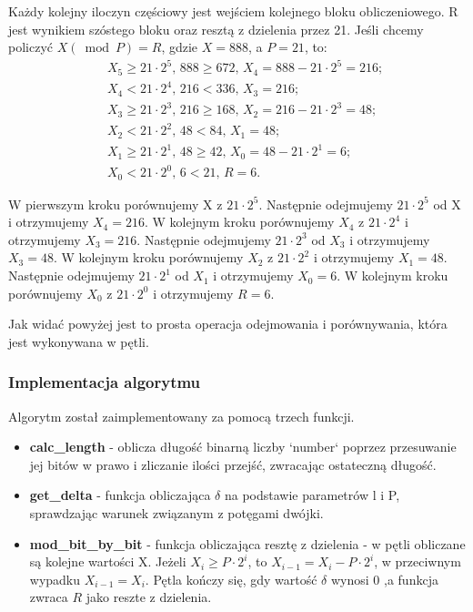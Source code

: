 \documentclass[11pt]{article}
\renewcommand\*{\cdot}
\begin{document}
Każdy kolejny iloczyn częściowy jest wejściem kolejnego bloku obliczeniowego. R jest wynikiem szóstego bloku oraz resztą z dzielenia przez 21.
Jeśli chcemy policzyć $X(\bmod P)=R$, gdzie $X = 888$, a $P = 21$, to:
$$
    \begin{aligned}
         & \text { } X_5 \geq 21 \cdot 2^5 \text {, } 888 \geq 672 \text {,  } X_4=888-21 \cdot 2^5=216 \text {; } \\
         & \text { } X_4<21 \cdot 2^4 \text {,  } 216<336 \text {,  } X_3=216 ;                                    \\
         & \text { } X_3 \geq 21 \cdot 2^3 \text {,  } 216 \geq 168 \text {,  } X_2=216-21 \cdot 2^3=48 \text {; } \\
         & \text {  } X_2<21 \cdot 2^2 \text {,  } 48<84 \text {,  } X_1=48 ;                                      \\
         & \text {  } X_1 \geq 21 \cdot 2^1 \text {,  } 48 \geq 42 \text {,  } X_0=48-21 \cdot 2^1=6 \text {; }    \\
         & \text { } X_0<21 \cdot 2^0 \text {, } 6<21 \text {,  } R=6 \text {. }
    \end{aligned}
$$

W pierwszym kroku porównujemy X z $21 \cdot 2^5$.
Następnie odejmujemy $21 \cdot 2^5$ od X i otrzymujemy $X_4=216$.
W kolejnym kroku porównujemy $X_4$ z $21 \cdot 2^4$ i otrzymujemy $X_3=216$.
Następnie odejmujemy $21 \cdot 2^3$ od $X_3$ i otrzymujemy $X_3=48$.
W kolejnym kroku porównujemy $X_2$ z $21 \cdot 2^2$ i otrzymujemy $X_1=48$.
Następnie odejmujemy $21 \cdot 2^1$ od $X_1$ i otrzymujemy $X_0=6$.
W kolejnym kroku porównujemy $X_0$ z $21 \cdot 2^0$ i otrzymujemy $R=6$.


Jak widać powyżej jest to prosta operacja odejmowania i porównywania, która jest wykonywana w pętli.
\subsubsection{Implementacja algorytmu}
Algorytm został zaimplementowany za pomocą trzech funkcji.
\begin{itemize}
    \item \textbf{calc\_length} - oblicza długość binarną liczby `number` poprzez przesuwanie jej bitów w prawo i zliczanie ilości przejść, zwracając ostateczną długość.
    \item \textbf{get\_delta} - funkcja obliczająca $\delta$ na podstawie parametrów l i P, sprawdzając warunek związanym z potęgami dwójki.
    \item \textbf{mod\_bit\_by\_bit} - funkcja obliczająca resztę z dzielenia - w pętli obliczane są kolejne wartości X.
          Jeżeli $X_i \geq P \cdot 2^i$, to $X_{i-1}=X_i-P \cdot 2^i$, w przeciwnym wypadku $X_{i-1}=X_i$.
          Pętla kończy się, gdy wartość $\delta$ wynosi 0 ,a funkcja zwraca $R$ jako reszte z dzielenia.
\end{itemize}
\begin{thebibliography}{9}
\end{thebibliography}
\end{document}
